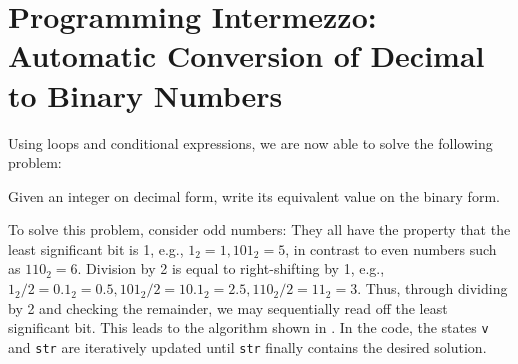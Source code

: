 \documentclass[springer.tex]{subfiles}
\begin{document}
\clearpage

\section{Programming Intermezzo: Automatic Conversion of Decimal to Binary Numbers}
Using loops and conditional expressions, we are now able to solve the following problem:
\begin{task}
  Given an integer on decimal form, write its equivalent value on the binary form.
\end{task}
To solve this problem, consider odd numbers: They all have the property that the least significant bit is 1, e.g., $1_2 = 1, 101_2 = 5$, in contrast to even numbers such as $110_2 = 6$. Division by 2 is equal to right-shifting by 1, e.g., $1_2/2 = 0.1_2 = 0.5, 101_2/2 = 10.1_2 = 2.5, 110_2/2 = 11_2 = 3$. Thus, through dividing by 2 and checking the remainder, we may sequentially read off the least significant bit. This leads to the algorithm shown in .
%
%
In the code, the states \lstinline!v! and \lstinline!str! are iteratively updated until \lstinline!str! finally contains the desired solution.
\end{document}
